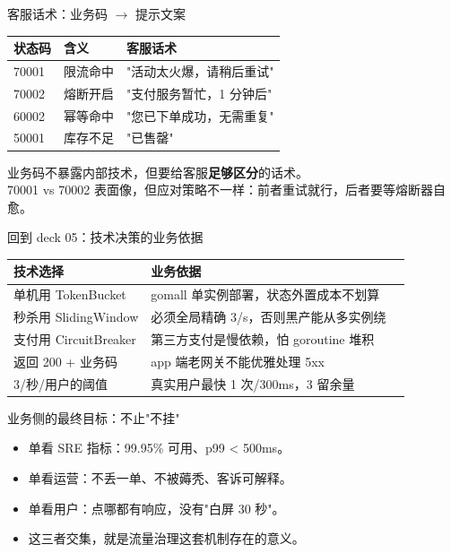 \begin{frame}{客服话术：业务码 $\to$ 提示文案}
\begin{tabular}{@{}lll@{}}
\toprule
状态码 & 含义       & 客服话术 \\
\midrule
70001  & 限流命中   & "活动太火爆，请稍后重试"   \\
70002  & 熔断开启   & "支付服务暂忙，1 分钟后" \\
60002  & 幂等命中   & "您已下单成功，无需重复" \\
50001  & 库存不足   & "已售罄"               \\
\bottomrule
\end{tabular}
\vspace{3mm}
\small 业务码不暴露内部技术，但要给客服\textbf{足够区分}的话术。\\
70001 vs 70002 表面像，但应对策略不一样：前者重试就行，后者要等熔断器自愈。
\end{frame}

\begin{frame}{回到 deck 05：技术决策的业务依据}
\begin{tabular}{@{}lll@{}}
\toprule
技术选择 & 业务依据 \\
\midrule
单机用 TokenBucket  & gomall 单实例部署，状态外置成本不划算 \\
秒杀用 SlidingWindow & 必须全局精确 3/s，否则黑产能从多实例绕 \\
支付用 CircuitBreaker & 第三方支付是慢依赖，怕 goroutine 堆积 \\
返回 200 + 业务码    & app 端老网关不能优雅处理 5xx \\
3/秒/用户的阈值       & 真实用户最快 1 次/300ms，3 留余量 \\
\bottomrule
\end{tabular}
\vspace{2mm}
\end{frame}

\begin{frame}{业务侧的最终目标：不止"不挂"}
\begin{itemize}
  \item 单看 SRE 指标：99.95\% 可用、p99 < 500ms。
  \item 单看运营：不丢一单、不被薅秃、客诉可解释。
  \item 单看用户：点哪都有响应，没有"白屏 30 秒"。
  \item 这三者交集，就是流量治理这套机制存在的意义。
\end{itemize}
\end{frame}

